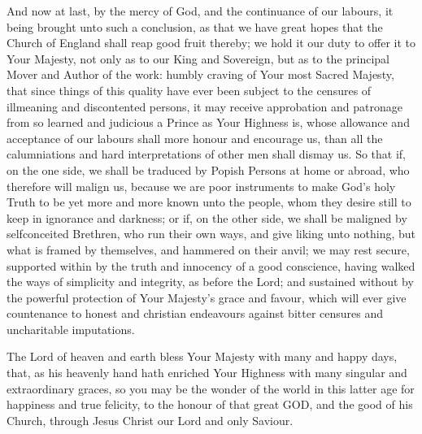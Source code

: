 And now at last, by the mercy of God, and the continuance of our labours, it being brought unto such a conclusion, as that we have great hopes that the Church of England shall reap good fruit thereby; we hold it our duty to offer it to Your Majesty, not only as to our King and Sovereign, but as to the principal Mover and Author of the work: humbly craving of Your most Sacred Majesty, that since things of this quality have ever been subject to the censures of illmeaning and discontented persons, it may receive approbation and patronage from so learned and judicious a Prince as Your Highness is, whose allowance and acceptance of our labours shall more honour and encourage us, than all the calumniations and hard interpretations of other men shall dismay us. So that if, on the one side, we shall be traduced by Popish Persons at home or abroad, who therefore will malign us, because we are poor instruments to make God's holy Truth to be yet more and more known unto the people, whom they desire still to keep in ignorance and darkness; or if, on the other side, we shall be maligned by selfconceited Brethren, who run their own ways, and give liking unto nothing, but what is framed by themselves, and hammered on their anvil; we may rest secure, supported within by the truth and innocency of a good conscience, having walked the ways of simplicity and integrity, as before the Lord; and sustained without by the powerful protection of Your Majesty's grace and favour, which will ever give countenance to honest and christian endeavours against bitter censures and uncharitable imputations.

The Lord of heaven and earth bless Your Majesty with many and happy days, that, as his heavenly hand hath enriched Your Highness with many singular and extraordinary graces, so you may be the wonder of the world in this latter age for happiness and true felicity, to the honour of that great GOD, and the good of his Church, through Jesus Christ our Lord and only Saviour.
